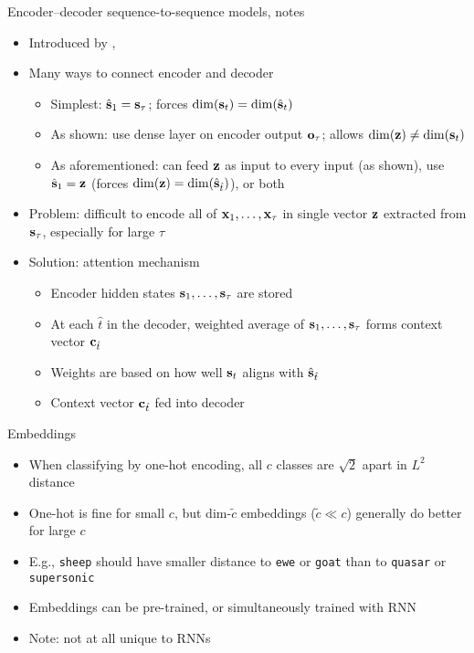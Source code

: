 \begin{frame}{Encoder--decoder sequence-to-sequence models, notes}
    \begin{itemize}
        \item Introduced by \citet{ChoEMNLP14}, \citet{Sutskever14}
        \item Many ways to connect encoder and decoder
        \begin{itemize}
            \item Simplest: $\hat{\mathbf{s}}_1 = \mathbf{s}_\tau$; forces $\dim(\mathbf{s}_t) = \dim(\hat{\mathbf{s}}_t)$
            \item As shown: use dense layer on encoder output $\mathbf{o}_\tau$; allows $\dim(\mathbf{z}) \ne \dim(\mathbf{s}_t)$
            \item As aforementioned: can feed $\mathbf{z}$ as input to every input (as shown), use $\hat{\mathbf{s}}_1 = \mathbf{z}$ (forces $\dim(\mathbf{z}) = \dim(\hat{\mathbf{s}}_{\hat{t}})$), or both
        \end{itemize}
        \pause
        \item Problem: difficult to encode all of $\mathbf{x}_1, \dots, \mathbf{x}_\tau$ in single vector $\mathbf{z}$ extracted from $\mathbf{s}_\tau$, especially for large $\tau$
        \item Solution: attention mechanism \citep{BahdanauICLR15}
        \begin{itemize}
            \item Encoder hidden states $\mathbf{s}_1, \dots, \mathbf{s}_\tau$ are stored
            \item At each $\hat{t}$ in the decoder, weighted average of $\mathbf{s}_1, \dots, \mathbf{s}_\tau$ forms context vector $\mathbf{c}_{\hat{t}}$
            \item Weights are based on how well $\mathbf{s}_t$ aligns with $\hat{\mathbf{s}}_{\hat{t}}$
            \item Context vector $\mathbf{c}_{\hat{t}}$ fed into decoder
        \end{itemize}
    \end{itemize}
\end{frame}

\begin{frame}{Embeddings}
    \begin{itemize}
        \item When classifying by one-hot encoding, all $c$ classes are $\sqrt{2}$ apart in $L^2$ distance
        \item One-hot is fine for small $c$, but dim-$\tilde{c}$ embeddings ($\tilde{c} \ll c$) generally do better for large $c$
        \item E.g., \texttt{sheep} should have smaller distance to \texttt{ewe} or \texttt{goat} than to \texttt{quasar} or \texttt{supersonic}
        \item Embeddings can be pre-trained, or simultaneously trained with RNN
        \item Note: not at all unique to RNNs
    \end{itemize}

    
\end{frame}

